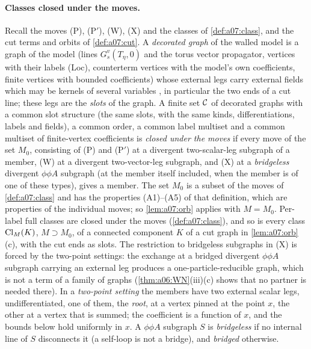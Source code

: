 
\paragraph{Classes closed under the moves.} Recall the moves (P), (P$'$), (W), (X) and the classes of \cref{def:a07:class}, and the cut terms and orbits of \cref{def:a07:cut}. A \emph{decorated graph} of the walled model is a graph of the model (lines $G^v_s(T_\eta,0)$ and the torus vector propagator, vertices \cite[(1.6)--(1.15)]{Ba3} with their labels (Loc), counterterm vertices with the model's own coefficients, finite \cite[(1.7)]{Ba3} vertices with bounded coefficients) whose external legs carry external fields which may be kernels of several variables \cite[p.~419]{Ba3}, in particular the two ends of a cut line; these legs are the \emph{slots} of the graph. A finite set $\mathcal C$ of decorated graphs with a common slot structure (the same slots, with the same kinds, differentiations, labels and fields), a common order, a common label multiset and a common multiset of finite-vertex coefficients is \emph{closed under the moves} if every move of the set $M_0$, consisting of (P) and (P$'$) at a divergent two-scalar-leg subgraph of a member, (W) at a divergent two-vector-leg subgraph, and (X) at a \emph{bridgeless} divergent $\phi\phi A$ subgraph (at the member itself included, when the member is of one of these types), gives a member. The set $M_0$ is a subset of the moves of \cref{def:a07:class} and has the properties (A1)--(A5) of that definition, which are properties of the individual moves; so \cref{lem:a07:orb} applies with $M=M_0$. Per-label full classes are closed under the moves (\cref{def:a07:class}), and so is every class $\operatorname{Cl}_{M}(K)$, $M\supset M_0$, of a connected component $K$ of a cut graph in \cref{lem:a07:orb}(c), with the cut ends as slots. The restriction to bridgeless subgraphs in (X) is forced by the two-point settings: the exchange at a bridged divergent $\phi\phi A$ subgraph carrying an external leg produces a one-particle-reducible graph, which is not a term of a family of \cite[(1.23)]{Ba3} graphs (\cref{thm:a06:WN}(iii)(c) shows that no partner is needed there). In a \emph{two-point setting} the members have two external scalar legs, undifferentiated, one of them, the \emph{root}, at a vertex pinned at the point $x$, the other at a vertex that is summed; the coefficient is a function of $x$, and the bounds below hold uniformly in $x$. A $\phi\phi A$ subgraph $S$ is \emph{bridgeless} if no internal line of $S$ disconnects it (a self-loop is not a bridge), and \emph{bridged} otherwise.

